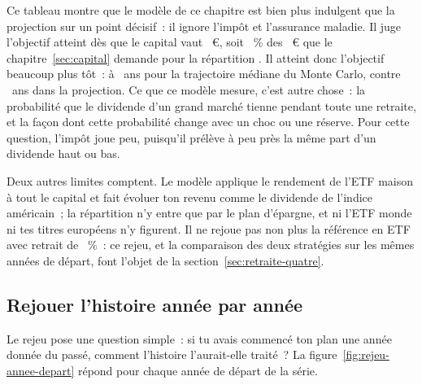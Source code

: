Ce tableau montre que le mod\`ele de ce chapitre est bien plus indulgent que la projection sur un
point d\'ecisif~: il ignore l'imp\^ot et l'assurance maladie. Il juge l'objectif atteint d\`es que le
capital vaut \McKapitalSeuil~€, soit \McKapitalSeuilPartProzent~\% des \KapitalRequisReference~€ que le
chapitre~\ref{sec:capital} demande pour la r\'epartition \ReferenzStrategie. Il atteint donc
l'objectif beaucoup plus t\^ot~: \`a \McAgeObjectifMedian~ans pour la trajectoire m\'ediane du Monte
Carlo, contre \AlterYannBasis~ans dans la projection.  Ce que ce
mod\`ele mesure, c'est autre chose~: la probabilit\'e que le dividende d'un grand march\'e tienne
pendant toute une retraite, et la fa\c{c}on dont cette probabilit\'e change avec un choc ou une
r\'eserve. Pour cette question, l'imp\^ot joue peu, puisqu'il pr\'el\`eve \`a peu pr\`es la m\^eme part
d'un dividende haut ou bas.

Deux autres limites comptent. Le mod\`ele applique le rendement de l'ETF maison \`a tout le capital et
fait \'evoluer ton revenu comme le dividende de l'indice am\'ericain~; la r\'epartition
\ReferenzStrategie{} n'y entre que par le plan d'\'epargne, et ni l'ETF monde ni tes titres europ\'eens
n'y figurent. Il ne rejoue pas non plus la r\'ef\'erence en ETF avec retrait de \TauxRetrait~\%~: ce rejeu, et la
comparaison des deux strat\'egies sur les m\^emes ann\'ees de d\'epart, font l'objet de la
section~\ref{sec:retraite-quatre}.

\subsection{Rejouer l'histoire ann\'ee par ann\'ee}\label{sec:risques-rejeu}

Le rejeu pose une question simple~: si tu avais commenc\'e ton plan une ann\'ee donn\'ee du pass\'e,
comment l'histoire l'aurait-elle trait\'e~? La figure~\ref{fig:rejeu-annee-depart} r\'epond pour
chaque ann\'ee de d\'epart de la s\'erie.


